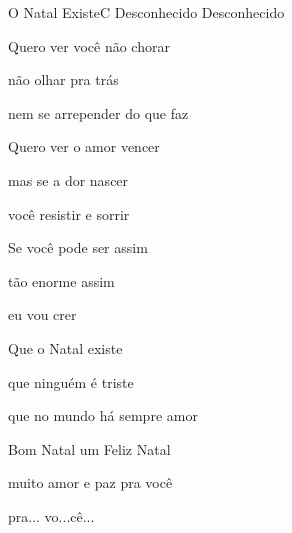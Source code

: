 \documentclass[a4,12pt,oneside]{book}
\newcommand{\RevDate}{\today}
\newcommand{\NotCCLIed}{\relax}
\begin{document}
\begin{song}{O Natal Existe}{C}
  {Desconhecido}
  {Desconhecido}
  {}
  {\NotCCLIed}
  
	\renewcommand{\RevDate}{28 de abril de 2015}
 
	\SBIntro[N]{\Ch{}{}}
	
	\ifChordBk	
		\vspace{-2em}\flushright{\Cchord \quad \Amchord \quad \Aschord \quad \Dmchord \quad \Fchord \quad \Gchord}
		\vspace{-1ex}
	\fi
	
	\begin{SBVerse*}
		Quero ver você não chorar

		não olhar pra trás

		nem se arrepender do que faz
	\end{SBVerse*}

	\begin{SBVerse*}
		Quero ver o amor vencer

		mas se a dor nascer

		você resistir e sorrir
	\end{SBVerse*}

	\begin{SBVerse*}
		Se você pode ser assim

		tão enorme assim

		eu vou crer
	\end{SBVerse*}
		
	\begin{SBVerse*}
		Que o Natal existe

		que ninguém é triste

		que no mundo há sempre amor
	\end{SBVerse*}
		
	\begin{SBVerse*}
		Bom Natal um Feliz Natal

		muito amor e paz pra você

		pra... vo...cê...
	\end{SBVerse*}
\end{song}
\end{document}
